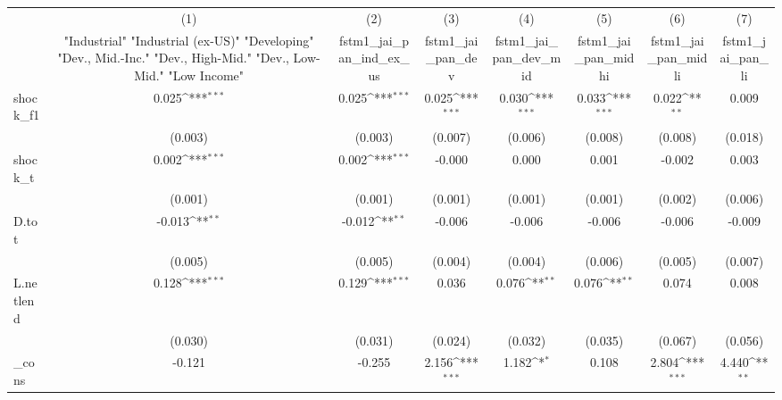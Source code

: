 {
\def\sym#1{\ifmmode^{#1}\else\(^{#1}\)\fi}
\begin{tabular}{l*{7}{c}}
\toprule
            &\multicolumn{1}{c}{(1)}&\multicolumn{1}{c}{(2)}&\multicolumn{1}{c}{(3)}&\multicolumn{1}{c}{(4)}&\multicolumn{1}{c}{(5)}&\multicolumn{1}{c}{(6)}&\multicolumn{1}{c}{(7)}\\
            &\multicolumn{1}{c}{ "Industrial" "Industrial (ex-US)" "Developing" "Dev., Mid.-Inc." "Dev., High-Mid."  "Dev., Low-Mid." "Low Income" }&\multicolumn{1}{c}{fstm1\_jai\_pan\_ind\_ex\_us}&\multicolumn{1}{c}{fstm1\_jai\_pan\_dev}&\multicolumn{1}{c}{fstm1\_jai\_pan\_dev\_mid}&\multicolumn{1}{c}{fstm1\_jai\_pan\_midhi}&\multicolumn{1}{c}{fstm1\_jai\_pan\_midli}&\multicolumn{1}{c}{fstm1\_jai\_pan\_li}\\
\midrule
shock\_f1    &       0.025\sym{***}&       0.025\sym{***}&       0.025\sym{***}&       0.030\sym{***}&       0.033\sym{***}&       0.022\sym{**} &       0.009         \\
            &     (0.003)         &     (0.003)         &     (0.007)         &     (0.006)         &     (0.008)         &     (0.008)         &     (0.018)         \\
\addlinespace
shock\_t     &       0.002\sym{***}&       0.002\sym{***}&      -0.000         &       0.000         &       0.001         &      -0.002         &       0.003         \\
            &     (0.001)         &     (0.001)         &     (0.001)         &     (0.001)         &     (0.001)         &     (0.002)         &     (0.006)         \\
\addlinespace
D.tot       &      -0.013\sym{**} &      -0.012\sym{**} &      -0.006         &      -0.006         &      -0.006         &      -0.006         &      -0.009         \\
            &     (0.005)         &     (0.005)         &     (0.004)         &     (0.004)         &     (0.006)         &     (0.005)         &     (0.007)         \\
\addlinespace
L.netlend   &       0.128\sym{***}&       0.129\sym{***}&       0.036         &       0.076\sym{**} &       0.076\sym{**} &       0.074         &       0.008         \\
            &     (0.030)         &     (0.031)         &     (0.024)         &     (0.032)         &     (0.035)         &     (0.067)         &     (0.056)         \\
\addlinespace
\_cons      &      -0.121         &      -0.255         &       2.156\sym{***}&       1.182\sym{*}  &       0.108         &       2.804\sym{***}&       4.440\sym{**} \\

\end{tabular}}
